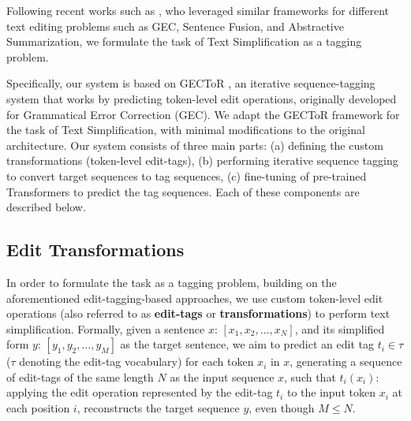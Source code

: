 \documentclass[11pt,a4paper]{article}
\begin{document}
Following recent works such as \citet{malmi-etal-2019-encode, awasthi-etal-2019-parallel, omelianchuk-etal-2020-gector}, who leveraged similar frameworks for different text editing problems such as GEC, Sentence Fusion, and Abstractive Summarization, we formulate the task of Text Simplification as a tagging problem.

Specifically, our system is based on GECToR \cite{omelianchuk-etal-2020-gector}, an iterative sequence-tagging system that works by predicting token-level edit operations, originally developed for Grammatical Error Correction (GEC). 
We adapt the GECToR framework for the task of Text Simplification, with minimal modifications to the original architecture. Our system consists of three main parts: (a) defining the custom transformations (token-level edit-tags), (b) performing iterative sequence tagging to convert target sequences to tag sequences, (c) fine-tuning of pre-trained Transformers to predict the tag sequences. Each of these components are described below.

\subsection{Edit Transformations}
\label{section:transformations}
In order to formulate the task as a tagging problem, building on the aforementioned edit-tagging-based approaches, we use custom token-level edit operations (also referred to as \textbf{edit-tags} or \textbf{transformations}) to perform text simplification. Formally, given a sentence $x$: $[x_1, x_2, \dots , x_N]$, and its simplified form $y$: $[y_1, y_2, \dots , y_M]$ as the target sentence, we aim to predict an edit tag $t_i \in \tau$ ($\tau$ denoting the edit-tag vocabulary) for each token $x_i$ in $x$, generating a sequence of edit-tags of the same length $N$ as the input sequence $x$, such that $t_i(x_i)$: applying the edit operation represented by the edit-tag $t_i$ to the input token $x_i$ at each position $i$, reconstructs the target sequence $y$, even though $M \leq N$.
\end{document}
